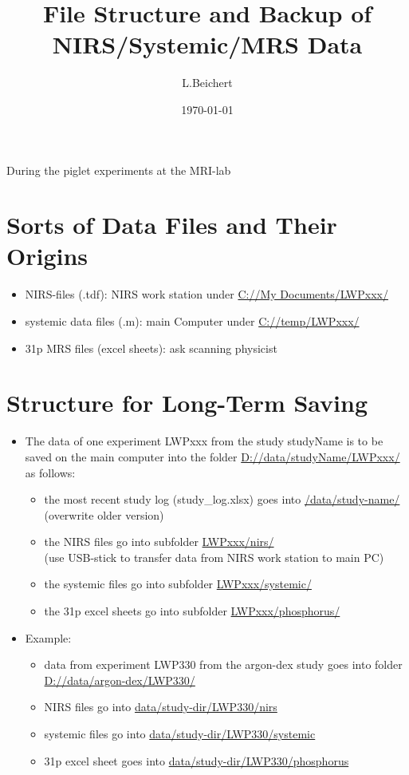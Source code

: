 \documentclass[11pt]{article}
\title{File Structure and Backup of NIRS/Systemic/MRS Data}
\author{L.Beichert}
\date{\today}
\begin{document}
\maketitle
\paragraph*{} During the piglet experiments at the MRI-lab 
\section*{Sorts of Data Files and Their Origins}
\begin{itemize}
\item NIRS-files (.tdf): NIRS work station under  \url{C://My Documents/LWPxxx/} 
\item systemic data files (.m): main Computer under \url{C://temp/LWPxxx/}
\item 31p MRS files (excel sheets): ask scanning physicist
\end{itemize}

\section*{Structure for Long-Term Saving}
\begin{itemize}
\item The data of one experiment LWPxxx from the study studyName  is to be saved on the main computer into the folder \url{D://data/studyName/LWPxxx/} as follows:
\begin{itemize}
	\item the most recent study log (study\_log.xlsx) goes into \url{/data/study-name/} (overwrite older version)
	\item the NIRS files go into subfolder \url{LWPxxx/nirs/} \\(use USB-stick to transfer data from NIRS work station to main PC)
	\item the systemic files go into subfolder \url{LWPxxx/systemic/}
	\item the 31p excel sheets go into subfolder \url{LWPxxx/phosphorus/}
\end{itemize}
\item Example:
\begin{itemize}
	\item data from experiment LWP330 from the argon-dex study goes into folder \url{D://data/argon-dex/LWP330/}
	\item NIRS files go into \url{data/study-dir/LWP330/nirs}
	\item systemic files go into \url{data/study-dir/LWP330/systemic}
	\item 31p excel sheet goes into \url{data/study-dir/LWP330/phosphorus}
\end{itemize}

\end{itemize}
\end{document}
